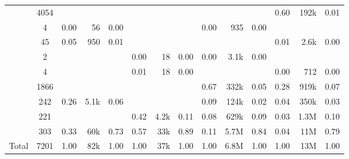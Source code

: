 \documentclass[
]{article}
\begin{document}
\begin{table}
\begin{tabular}[t]{rcrrcrrcrrcrrr}
 & 4054 & \cellcolor{gray}{  } & \cellcolor{gray}{  } & \cellcolor{gray}{  } & \cellcolor{gray}{  } & \cellcolor{gray}{  } & \cellcolor{gray}{  } & \cellcolor{gray}{  } & \cellcolor{gray}{  } & \cellcolor{gray}{  } & 0.60 & 192k & 0.01\\
\addlinespace
 & 4 & 0.00 & 56 & 0.00 & \cellcolor{gray}{  } & \cellcolor{gray}{  } & \cellcolor{gray}{  } & 0.00 & 935 & 0.00 & \cellcolor{gray}{  } & \cellcolor{gray}{  } & \cellcolor{gray}{  }\\
 & 45 & 0.05 & 950 & 0.01 & \cellcolor{gray}{  } & \cellcolor{gray}{  } & \cellcolor{gray}{  } & \cellcolor{gray}{  } & \cellcolor{gray}{  } & \cellcolor{gray}{  } & 0.01 & 2.6k & 0.00\\
 & 2 & \cellcolor{gray}{  } & \cellcolor{gray}{  } & \cellcolor{gray}{  } & 0.00 & 18 & 0.00 & 0.00 & 3.1k & 0.00 & \cellcolor{gray}{  } & \cellcolor{gray}{  } & \cellcolor{gray}{  }\\
 & 4 & \cellcolor{gray}{  } & \cellcolor{gray}{  } & \cellcolor{gray}{  } & 0.01 & 18 & 0.00 & \cellcolor{gray}{  } & \cellcolor{gray}{  } & \cellcolor{gray}{  } & 0.00 & 712 & 0.00\\
 & 1866 & \cellcolor{gray}{  } & \cellcolor{gray}{  } & \cellcolor{gray}{  } & \cellcolor{gray}{  } & \cellcolor{gray}{  } & \cellcolor{gray}{  } & 0.67 & 332k & 0.05 & 0.28 & 919k & 0.07\\
\addlinespace
 & 242 & 0.26 & 5.1k & 0.06 & \cellcolor{gray}{  } & \cellcolor{gray}{  } & \cellcolor{gray}{  } & 0.09 & 124k & 0.02 & 0.04 & 350k & 0.03\\
 & 221 & \cellcolor{gray}{  } & \cellcolor{gray}{  } & \cellcolor{gray}{  } & 0.42 & 4.2k & 0.11 & 0.08 & 629k & 0.09 & 0.03 & 1.3M & 0.10\\
\addlinespace
 & 303 & 0.33 & 60k & 0.73 & 0.57 & 33k & 0.89 & 0.11 & 5.7M & 0.84 & 0.04 & 11M & 0.79\\
\midrule
Total & 7201 & 1.00 & 82k & 1.00 & 1.00 & 37k & 1.00 & 1.00 & 6.8M & 1.00 & 1.00 & 13M & 1.00\\
\bottomrule
\end{tabular}
\end{table}
\end{document}
